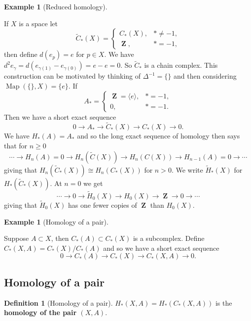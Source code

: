 \documentclass[10pt,]{book}
\newcommand{\gt}{>}
\newcommand{\terminology}[1]{\textbf{#1}}
\theoremstyle{plain}
\theoremstyle{definition}
\newtheorem{definition}[theorem]{Definition}
\newtheorem{example}[theorem]{Example}
\numberwithin{equation}{section}
\DeclareMathOperator{\Map}{Map}
\DeclareMathOperator{\ZZ}{\mathbf{Z}}
\begin{document}
\begin{example}[Reduced homology]\label{example-8}

              If \(X\) is a space let
              \[
                \tilde C_*(X) = \begin{cases}C_*(X), &* \ne -1,\\\ZZ, & * = -1,\end{cases}
              \]
              then define \(d(e_p)= e\) for \(p \in X\).
              We have \(d^2e_\gamma = d(e_{\gamma(1)} - e_{\gamma(0)}) = e - e = 0\).
              So \(\tilde C_*\) is a chain complex.
              \newline{}
              This construction can be motivated by thinking of \(\Delta^{-1} = \{\}\) and then considering \(\Map(\{\},X) = \{e\}\).
              If
              \[
                A_* = \begin{cases} \ZZ = \langle e \rangle, & * = -1, \\ 0, & * = -1.\end{cases}
              \]
              Then we have a short exact sequence
              \[
                0 \to A_* \to \tilde C_*(X) \to C_*(X) \to 0.
              \]
              We have \(H_*(A) = A_*\) and so the long exact sequence of homology then says that for \(n \ge 0\)\[
                \cdots \to H_n(A) = 0 \to H_n(\tilde C(X))\to H_n(C(X)) \to H_{n-1}(A)= 0 \to \cdots
              \]
              giving that \(H_n(\tilde C_*(X)) \cong H_n(C_*(X))\) for \(n \gt 0\).
              We write \(\tilde H_*(X)\) for \(H_*(\tilde C_*(X))\). 
              At \(n = 0\) we get
              \[
                \cdots \to 0 \to \tilde H_0(X)\to H_0(X) \to \ZZ \to 0 \to\cdots
              \]
              giving that \(\tilde H_0(X)\) has one fewer copies of \(\ZZ\) than \(H_0(X)\).
            \end{example}
\begin{example}[Homology of a pair]\label{example-9}

              Suppose \(A\subset X\), then \(C_*(A) \subset C_*(X)\) is a subcomplex.
              Define \(C_*(X,A) = C_*(X)/C_*(A)\) and so we have a short exact sequence
              \[
                0 \to C_*(A) \to C_*(X) \to C_*(X,A) \to 0.
              \]\end{example}
\typeout{************************************************}
\typeout{************************************************}
\subsection[Homology of a pair]{Homology of a pair}\label{subsection-7}
\begin{definition}[Homology of a pair]\label{definition-14}
\(H_*(X,A) = H_*(C_*(X,A))\) is the \terminology{homology of the pair \((X,A)\)}.
            \end{definition}
\end{document}
